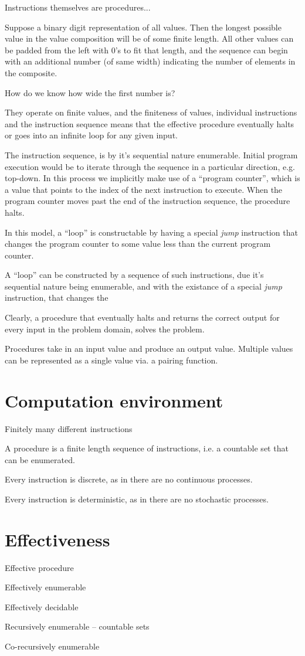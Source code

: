 Instructions themselves are procedures...

Suppose a binary digit representation of all values. Then the longest possible
value in the value composition will be of some finite length. All other values
can be padded from the left with $0$'s to fit that length, and the sequence can
begin with an additional number (of same width) indicating the number of
elements in the composite.

How do we know how wide the first number is?

They operate on finite
values, and the finiteness of values, individual instructions and the
instruction sequence means that the effective procedure eventually halts or
goes into an infinite loop for any given input. 

The instruction sequence, is by it's sequential nature enumerable. Initial
program execution would be to iterate through the sequence in a particular
direction, e.g. top-down. In this process we implicitly make use of a ``program
counter'', which is a value that points to the index of the next instruction to
execute. When the program counter moves past the end of the instruction
sequence, the procedure halts.

In this model, a ``loop'' is constructable by having a special \emph{jump}
instruction that changes the program counter to some value less than the
current program counter.

A ``loop'' can be constructed by a sequence of such instructions, due it's
sequential nature being enumerable, and with the existance of a special
\emph{jump} instruction, that changes the 

Clearly, a procedure that eventually halts and returns the correct output for
every input in the problem domain, solves the problem.


Procedures take in an input value and produce an output value. Multiple values
can be represented as a single value via. a pairing function.



\section{Computation environment}

Finitely many different instructions

A procedure is a finite length sequence of instructions, i.e. a countable set
that can be enumerated.

Every instruction is discrete, as in there are no continuous processes.

Every instruction is deterministic, as in there are no stochastic processes.

\section{Effectiveness}

Effective procedure

Effectively enumerable

Effectively decidable

Recursively enumerable -- countable sets

Co-recursively enumerable




